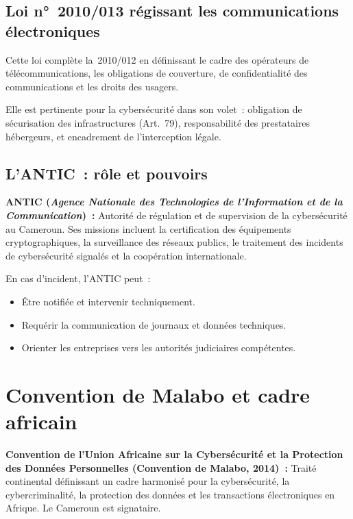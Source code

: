 \subsection{Loi n°~2010/013 régissant les communications électroniques}

Cette loi complète la~2010/012 en définissant le cadre des opérateurs de
télécommunications, les obligations de couverture, de confidentialité
des communications et les droits des usagers.

Elle est pertinente pour la cybersécurité dans son volet~: obligation de
sécurisation des infrastructures (Art.~79), responsabilité des prestataires
hébergeurs, et encadrement de l'interception légale.

\subsection{L'ANTIC~: rôle et pouvoirs}

\begin{boxdef}
\textbf{ANTIC (\textit{Agence Nationale des Technologies de l'Information
et de la Communication})~:} Autorité de régulation et de supervision de
la cybersécurité au Cameroun. Ses missions incluent la certification des
équipements cryptographiques, la surveillance des réseaux publics,
le traitement des incidents de cybersécurité signalés et la coopération
internationale.
\end{boxdef}

En cas d'incident, l'ANTIC peut~:
\begin{itemize}
  \item Être notifiée et intervenir techniquement.
  \item Requérir la communication de journaux et données techniques.
  \item Orienter les entreprises vers les autorités judiciaires compétentes.
\end{itemize}

\section{Convention de Malabo et cadre africain}
\label{sec:malabo}

\begin{boxdef}
\textbf{Convention de l'Union Africaine sur la Cybersécurité et la Protection
des Données Personnelles (Convention de Malabo, 2014)~:} Traité continental
définissant un cadre harmonisé pour la cybersécurité, la cybercriminalité,
la protection des données et les transactions électroniques en Afrique.
Le Cameroun est signataire.
\end{boxdef}

